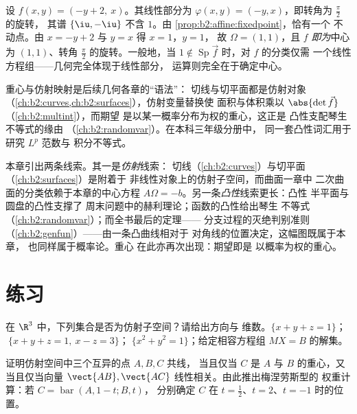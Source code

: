 \begin{example}[求旋转的中心]\label{ex:b2:affine:rotationcenter}
设 $f(x, y) = (-y + 2,\ x)$。其线性部分为
$\varphi(x, y) = (-y, x)$，即转角为 $\frac\pi2$ 的旋转，
其谱 $\{\iu, -\iu\}$ 不含 $1$。由
\cref{prop:b2:affine:fixedpoint}，恰有一个
不动点。由 $x = -y + 2$ 与 $y = x$ 得 $x = 1$，$y = 1$，
故 $\Omega = (1, 1)$，且 $f$ \emph{即为}中心为
$(1, 1)$、转角 $\frac\pi2$ 的旋转。一般地，当 $1
\notin \operatorname{Sp}\vec f$ 时，对 $f$ 的分类仅需
一个线性方程组——几何完全体现于线性部分，
运算则完全在于确定中心。
\end{example}

\begin{remark}[仿射语言的后续应用]
重心与仿射映射是后续几何各章的“语法”：
切线与切平面都是仿射对象
（\cref{ch:b2:curves,ch:b2:surfaces}），仿射变量替换使
面积与体积乘以
$\abs{\det \vec f}$（\cref{ch:b2:multint}），而期望
是以某一概率分布为权的重心，这正是
凸性支配琴生不等式的缘由
（\cref{ch:b2:randomvar}）。在本科三年级分册中，
同一套凸性词汇用于研究 $L^p$ 范数与
积分不等式。
\end{remark}

\begin{remark}[本册内的展望]
本章引出两条线索。其一是\emph{仿射}线索：
切线（\cref{ch:b2:curves}）与切平面
（\cref{ch:b2:surfaces}）是附着于
非线性对象上的仿射子空间，而曲面一章中
二次曲面的分类依赖于本章的中心方程
$A\Omega = -b$。另一条\emph{凸性}线索更长：凸性
半平面与圆盘的凸性支撑了
周末问题中的赫利理论；函数的凸性给出琴生
不等式（\cref{ch:b2:randomvar}）；而全书最后的定理——
分支过程的灭绝判别准则
（\cref{ch:b2:genfun}）——由一条凸曲线相对于
对角线的位置决定，这幅图既属于本章，
也同样属于概率论。重心
在此亦再次出现：期望即是
以概率为权的重心。
\end{remark}

\section{练习}

\begin{exercise}[$\star$]\label{exo:b2:affine:1}
在 $\R^3$ 中，下列集合是否为仿射子空间？请给出方向与
维数。$\{x + y + z = 1\}$；$\;\{x + y + z = 1,\ x - z =
3\}$；$\;\{x^2 + y^2 = 1\}$；给定相容方程组
$MX = B$ 的解集。
\end{exercise}

\begin{exercise}[$\star$]\label{exo:b2:affine:2}
证明仿射空间中三个互异的点 $A, B, C$ 共线，
当且仅当 $C$ 是 $A$ 与 $B$ 的重心，又当且仅当向量
$\vect{AB}, \vect{AC}$ 线性相关。由此推出梅涅劳斯型的
权重计算：若 $C = \operatorname{bar}(A, 1 - t; B, t)$，
分别确定 $C$ 在 $t = \frac12$、$t = 2$、$t = -1$ 时的位置。
\end{exercise}

